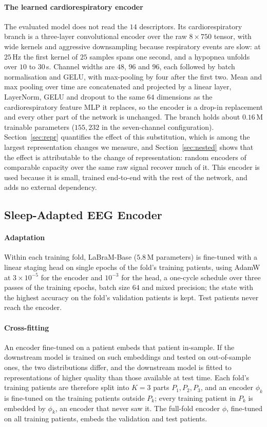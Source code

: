 \documentclass[a4paper,fleqn]{cas-sc}
\begin{document}
\paragraph{The learned cardiorespiratory encoder}
The evaluated model does not read the $14$ descriptors. Its cardiorespiratory branch is a three-layer convolutional encoder over the raw $8\times750$ tensor, with wide kernels and aggressive downsampling because respiratory events are slow: at $25$\,Hz the first kernel of $25$ samples spans one second, and a hypopnea unfolds over $10$ to $30$\,s. Channel widths are
$48$, $96$ and $96$, each followed by batch normalisation and GELU, with max-pooling by four
after the first two. Mean and max pooling over time are concatenated and projected by a
linear layer, LayerNorm, GELU and dropout to the same
$64$ dimensions as the cardiorespiratory feature MLP it replaces, so the encoder is a drop-in replacement and every
other part of the network is unchanged. The branch holds about $0.16$\,M trainable
parameters ($155{,}232$ in the seven-channel configuration). Section~\ref{sec:repr} quantifies the effect of this substitution, which is among the largest representation changes we measure, and Section~\ref{sec:nested} shows that the effect is attributable to the change of representation: random encoders of comparable capacity over the same raw signal recover much of it. This encoder is used because it is small,
trained end-to-end with the rest of the network, and adds no external dependency.

\subsection{Sleep-Adapted EEG Encoder}
\label{sec:encoder}
\paragraph{Adaptation} Within each training fold, LaBraM-Base ($5.8$\,M parameters) is
fine-tuned with a linear staging head on single epochs of the fold's training patients, using
AdamW at $3\times10^{-5}$ for the encoder and $10^{-3}$ for the head, a one-cycle schedule
over three passes of the training epochs, batch size $64$ and mixed precision; the state with
the highest accuracy on the fold's validation patients is kept. Test patients never reach the
encoder.

\paragraph{Cross-fitting} An encoder fine-tuned on a patient embeds that patient in-sample. If the downstream model is trained on such embeddings and tested on out-of-sample ones, the two distributions differ, and the downstream model is fitted to representations of higher quality than those available at test time. Each fold's training patients are therefore split
into $K=3$ parts $P_1,P_2,P_3$, and an encoder $\phi_k$ is fine-tuned on the training patients
outside $P_k$; every training patient in $P_k$ is embedded by $\phi_k$, an encoder that never
saw it. The full-fold encoder $\phi$, fine-tuned on all training patients, embeds the
validation and test patients.
\end{document}
